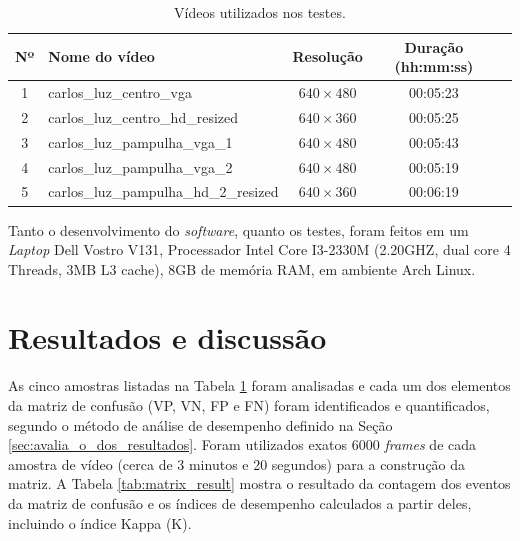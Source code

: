 \begin{table}[ht]
  \caption{Vídeos utilizados nos testes.}
  \label{tab:videos_teste}
  \begin{center}
    \begin{tabular}{clccc}
    \toprule
    \textbf{Nº} & \textbf{Nome do vídeo} & \textbf{Resolução} & \textbf{Duração (hh:mm:ss)} \\
    \midrule
      1 & carlos\_luz\_centro\_vga & $ 640\times 480 $ & 00:05:23 \\
      2 & carlos\_luz\_centro\_hd\_resized & $ 640\times 360 $ & 00:05:25 \\
      3 & carlos\_luz\_pampulha\_vga\_1 & $ 640\times 480 $ & 00:05:43 \\
      4 & carlos\_luz\_pampulha\_vga\_2 & $ 640\times 480 $ & 00:05:19 \\
      5 & carlos\_luz\_pampulha\_hd\_2\_resized & $ 640\times 360 $ & 00:06:19 \\
    \bottomrule
    \end{tabular}
  \end{center}
\end{table}

Tanto o desenvolvimento do \textit{software}, quanto os testes, foram feitos em um \textit{Laptop} Dell Vostro V131, Processador Intel Core I3-2330M (2.20GHZ, dual core 4 Threads, 3MB L3 cache), 8GB de memória RAM, em ambiente Arch Linux.


\section{Resultados e discussão} %
\label{sec:resultados_e_discuss_o}

As cinco amostras listadas na Tabela \ref{tab:videos_teste} foram analisadas e cada um dos elementos da matriz de confusão (VP, VN, FP e FN) foram identificados e quantificados, segundo o método de análise de desempenho definido na Seção \ref{sec:avalia_o_dos_resultados}. Foram utilizados exatos $6000$ \textit{frames} de cada amostra de vídeo (cerca de 3 minutos e 20 segundos) para a construção da matriz. A Tabela \ref{tab:matrix_result} mostra o resultado da contagem dos eventos da matriz de confusão e os índices de desempenho calculados a partir deles, incluindo o índice Kappa (K).

